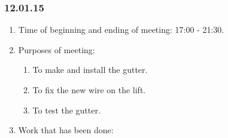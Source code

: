 \subsubsection{12.01.15}
\begin{enumerate}
	
	\item Time of beginning and ending of meeting: 17:00 - 21:30.
	
	\item Purposes of meeting: 
	\begin{enumerate}
		
	    \item To make and install the gutter.
			
		\item To fix the new wire on the lift.
		
		\item To test the gutter.
	    
	\end{enumerate}

	\item Work that has been done:
	\begin{enumerate}
		

\end{enumerate}
\end{enumerate}
